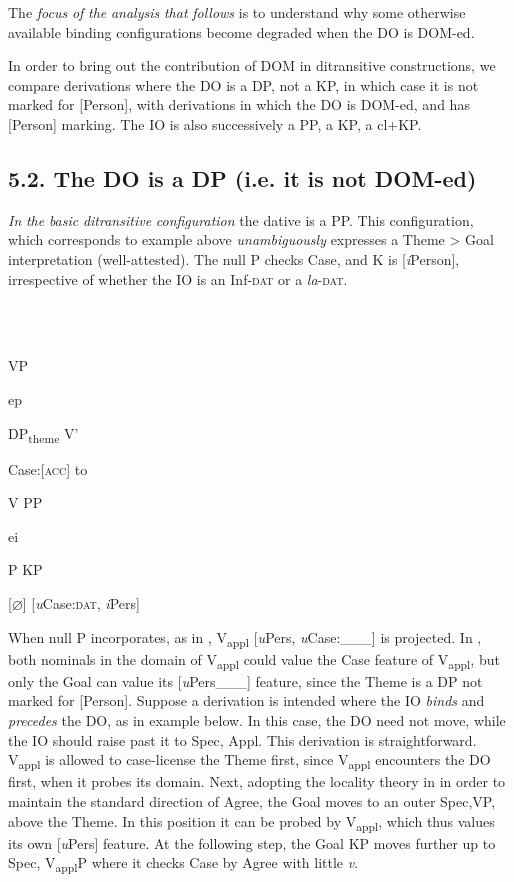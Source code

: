 \documentclass[output=paper,colorlinks,citecolor=brown]{./langscibook}
\begin{document}
The \textit{focus} \textit{of} \textit{the} \textit{analysis} \textit{that} \textit{follows} is to understand why some otherwise available binding configurations become degraded when the DO is DOM-ed.

In order to bring out the contribution of DOM in ditransitive constructions, we compare derivations where the DO is a DP, not a KP, in which case it is not marked for [Person], with derivations in which the DO is DOM-ed, and has [Person] marking. The IO is also successively a PP, a KP, a cl+KP.

\subsection{\textbf{5.2.} \textbf{The} \textbf{DO} \textbf{is} \textbf{a} \textbf{DP} \textbf{(i.e.} \textbf{it} \textbf{is} \textbf{not} \textbf{DOM-ed)}}

\textit{In} \textit{the} \textit{basic} \textit{ditransitive} \textit{configuration} the dative is a PP. This configuration, which corresponds to example  above \textit{unambiguously} expresses a Theme > Goal interpretation (well-attested). The null P checks Case, and K is [\textit{i}Person], irrespective of whether the IO is an Inf-\textsc{dat} or a \textit{la}{}-\textsc{dat}.

\ea%
    \label{ex:key:31}
    \gll\\
        \\
    \glt
    \z

              VP

                          ep

    DP\textsubscript{theme}        V’

Case:[\textsc{acc}]    to

    V    PP

      ei

      P    KP

            [${\varnothing}$]  [\textit{u}Case:\textsc{dat}, \textit{i}Pers]

When null P incorporates, as in , V\textsubscript{appl} [\textit{u}Pers, \textit{u}Case:\_\_\_] is projected. In , both nominals in the domain of V\textsubscript{appl} could value the Case feature of V\textsubscript{appl}, but only the Goal can value its [\textit{u}Pers\_\_\_] feature, since the Theme is a DP not marked for [Person]. Suppose a derivation is intended where the IO \textit{binds} and \textit{precedes} the DO, as in example  below. In this case, the DO need not move, while the IO should raise past it to Spec, Appl. This derivation is straightforward. V\textsubscript{appl} is allowed to case-license the Theme first, since V\textsubscript{appl} encounters the DO first, when it probes its domain. Next, adopting the locality theory in \citet{Dogget2004} in order to maintain the standard direction of Agree, the Goal moves to an outer Spec,VP, above the Theme. In this position it can be probed by V\textsubscript{appl}, which thus values its own [\textit{u}Pers] feature. At the following step, the Goal KP moves further up to Spec, V\textsubscript{appl}P where it checks Case by Agree with little \textit{v}. 
\end{document}

